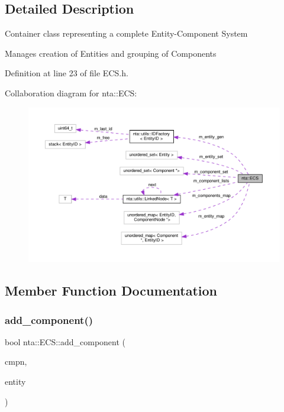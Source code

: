 \subsection{Detailed Description}
Container class representing a complete Entity-\/\+Component System

Manages creation of Entities and grouping of Components 

Definition at line 23 of file E\+C\+S.\+h.



Collaboration diagram for nta\+:\+:E\+CS\+:
\nopagebreak
\begin{figure}[H]
\begin{center}
\leavevmode
\includegraphics[width=350pt]{d5/d5c/classnta_1_1ECS__coll__graph}
\end{center}
\end{figure}


\subsection{Member Function Documentation}
\mbox{\label{classnta_1_1ECS_a3388e8ae1ef45258356c742efcc00048}} 
\subsubsection{\texorpdfstring{add\+\_\+component()}{add\_component()}}
{\footnotesize\ttfamily bool nta\+::\+E\+C\+S\+::add\+\_\+component (\begin{DoxyParamCaption}\item[{\hyperlink{classnta_1_1Component}{Component} $\ast$}]{cmpn,  }\item[{Entity\+ID}]{entity }\end{DoxyParamCaption})}

